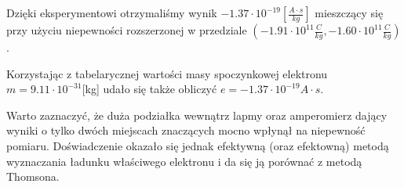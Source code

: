 \documentclass{article}
\begin{document}
Dzięki eksperymentowi otrzymaliśmy wynik $-1.37 \cdot 10^{-19} [\frac{A \cdot s}{kg}]$ mieszczący się przy użyciu niepewności rozszerzonej w przedziale $(-1.91 \cdot 10^{11} \frac{C}{kg}, -1.60 \cdot 10^{11} \frac{C}{kg})$. 

Korzystając z tabelarycznej wartości masy spoczynkowej elektronu $m = 9.11 \cdot 10^{-31} $[kg] udało się także obliczyć $e = -1.37 \cdot 10^{-19} A \cdot s$.

Warto zaznaczyć, że duża podziałka wewnątrz lapmy oraz amperomierz dający wyniki o tylko dwóch miejscach znaczących mocno wpłynął na niepewność pomiaru. Doświadczenie okazało się jednak efektywną (oraz efektowną) metodą wyznaczania ładunku właściwego elektronu i da się ją porównać z metodą Thomsona.





\end{document}
